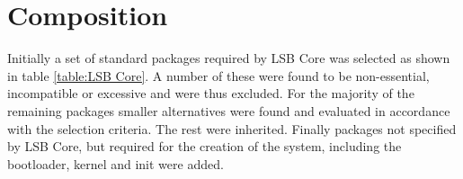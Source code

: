 \section{Composition}\label{Composition}

Initially a set of standard packages required by LSB Core was selected as shown in table \ref{table:LSB Core}. A number of these were found to be non-essential, incompatible or excessive and were thus excluded. For the majority of the remaining packages smaller alternatives were found and evaluated in accordance with the selection criteria. The rest were inherited. Finally packages not specified by LSB Core, but required for the creation of the system, including the bootloader, kernel and init were added.

\newpage

\newpage

\newpage

